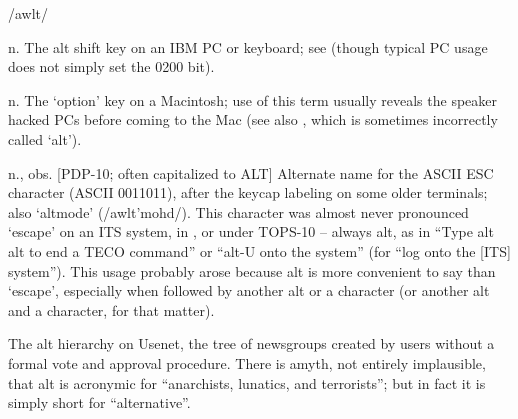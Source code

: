  /awlt/

\begin{inparaenum}
	\item n. The alt shift key on an IBM PC or  keyboard; see  (though typical PC usage does not
		simply set the 0200 bit).
	\item n. The `option' key on a Macintosh; use of this term usually reveals the speaker hacked PCs before coming to the Mac (see also
		, which is sometimes incorrectly called `alt').
	\item n., obs. [PDP-10; often capitalized to ALT] Alternate name for the ASCII ESC character (ASCII 0011011), after the keycap labeling
		on some older terminals; also `altmode' (/awlt'mohd/). This character was almost never pronounced `escape' on an ITS system, in
		, or under TOPS-10 -- always alt, as in ``Type alt alt to end a TECO command'' or ``alt-U onto the system'' (for
		``log onto the [ITS] system''). This usage probably arose because alt is more convenient to say than `escape', especially when
		followed by another alt or a character (or another alt and a character, for that matter).
	\item The alt hierarchy on Usenet, the tree of newsgroups created by users without a formal vote and approval procedure. There is amyth,
		not entirely implausible, that alt is acronymic for ``anarchists, lunatics, and terrorists''; but in fact it is simply short for
		``alternative''.
\end{inparaenum}

